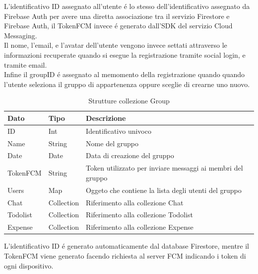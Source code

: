L'identificativo ID assegnato all'utente \'e lo stesso dell'identificativo assegnato da Firebase Auth per avere una diretta associazione tra il servizio Firestore e Firebase Auth, il TokenFCM invece \'e generato dall'SDK del servizio Cloud Messaging.\\
Il nome, l'email, e l'avatar dell'utente vengono invece settati attraverso le informazioni recuperate quando si esegue la registrazione tramite social login, e tramite email.\\
Infine il groupID \'e assegnato al memomento della registrazione quando quando l'utente seleziona il gruppo di appartenenza oppure sceglie di crearne uno nuovo.




\begin{table}[h]
\begin{center}
\begin{tabular}{|l|l|p{10cm}|}
    \hline
\textbf{Dato} & \textbf{Tipo}  & \textbf{Descrizione}\\ \hline
ID & Int & Identificativo univoco \\\hline
Name & String & Nome del gruppo \\ \hline
Date & Date & Data di creazione del gruppo \\ \hline
TokenFCM & String & Token utilizzato per inviare messaggi ai membri del gruppo \\ \hline
Users & Map & Oggeto che contiene la lista degli utenti del gruppo  \\ \hline
Chat & Collection &  Riferimento alla collezione Chat \\ \hline
Todolist & Collection &  Riferimento alla collezione Todolist \\ \hline
Expense & Collection & Riferimento alla collezione Expense \\
\hline
\end{tabular}
\caption[Struttura Group]{Strutture collezione Group}\label{tab:Struttura collezione Group}
\end{center}
\end{table}

L'identificativo ID \'e generato automaticamente dal database Firestore, mentre il TokenFCM viene generato facendo richiesta al server FCM indicando i token di ogni dispositivo.\\



